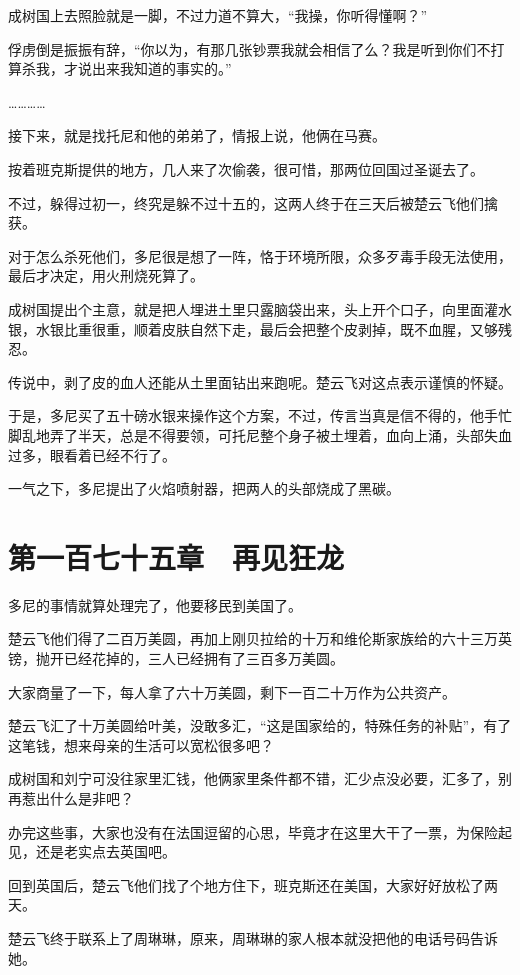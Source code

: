 成树国上去照脸就是一脚，不过力道不算大，“我操，你听得懂啊？”

俘虏倒是振振有辞，“你以为，有那几张钞票我就会相信了么？我是听到你们不打算杀我，才说出来我知道的事实的。”

…………

接下来，就是找托尼和他的弟弟了，情报上说，他俩在马赛。

按着班克斯提供的地方，几人来了次偷袭，很可惜，那两位回国过圣诞去了。

不过，躲得过初一，终究是躲不过十五的，这两人终于在三天后被楚云飞他们擒获。

对于怎么杀死他们，多尼很是想了一阵，恪于环境所限，众多歹毒手段无法使用，最后才决定，用火刑烧死算了。

成树国提出个主意，就是把人埋进土里只露脑袋出来，头上开个口子，向里面灌水银，水银比重很重，顺着皮肤自然下走，最后会把整个皮剥掉，既不血腥，又够残忍。

传说中，剥了皮的血人还能从土里面钻出来跑呢。楚云飞对这点表示谨慎的怀疑。

于是，多尼买了五十磅水银来操作这个方案，不过，传言当真是信不得的，他手忙脚乱地弄了半天，总是不得要领，可托尼整个身子被土埋着，血向上涌，头部失血过多，眼看着已经不行了。

一气之下，多尼提出了火焰喷射器，把两人的头部烧成了黑碳。

\section{第一百七十五章　再见狂龙}

多尼的事情就算处理完了，他要移民到美国了。

楚云飞他们得了二百万美圆，再加上刚贝拉给的十万和维伦斯家族给的六十三万英镑，抛开已经花掉的，三人已经拥有了三百多万美圆。

大家商量了一下，每人拿了六十万美圆，剩下一百二十万作为公共资产。

楚云飞汇了十万美圆给叶美，没敢多汇，“这是国家给的，特殊任务的补贴”，有了这笔钱，想来母亲的生活可以宽松很多吧？

成树国和刘宁可没往家里汇钱，他俩家里条件都不错，汇少点没必要，汇多了，别再惹出什么是非吧？

办完这些事，大家也没有在法国逗留的心思，毕竟才在这里大干了一票，为保险起见，还是老实点去英国吧。

回到英国后，楚云飞他们找了个地方住下，班克斯还在美国，大家好好放松了两天。

楚云飞终于联系上了周琳琳，原来，周琳琳的家人根本就没把他的电话号码告诉她。

